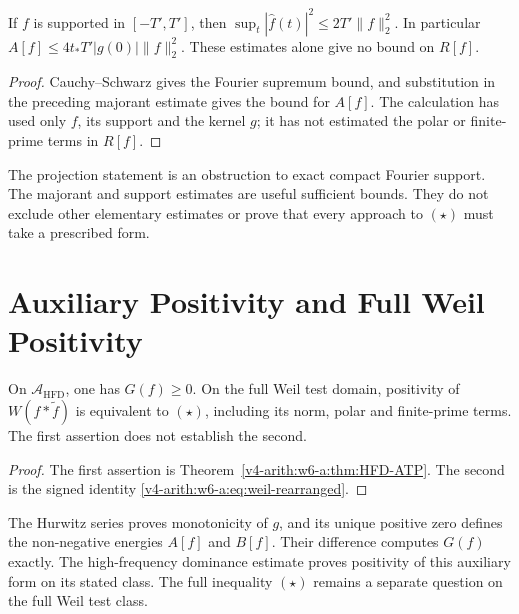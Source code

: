 \begin{proposition}
\label{v4-arith:w6-a:prop:rule-out-pw-shrinkage}
If \(f\) is supported in \([-T',T']\), then
\(\sup_t|\widehat f(t)|^2\leq2T'\|f\|_2^2\). In particular
\(A[f]\leq4t_*T'|g(0)|\|f\|_2^2\).
These estimates alone give no bound on \(R[f]\).
\end{proposition}
\begin{proof}
Cauchy--Schwarz gives the Fourier supremum bound, and substitution
in the preceding majorant estimate gives the bound for \(A[f]\).
The calculation has used only \(f\), its support and the kernel
\(g\); it has not estimated the polar or finite-prime terms in \(R[f]\).
\end{proof}

\begin{remark}
\label{v4-arith:w6-a:rem:three-rule-outs}
The projection statement is an obstruction to exact compact Fourier
support. The majorant and support estimates are useful sufficient
bounds. They do not exclude other elementary estimates or prove
that every approach to \((\star)\) must take a prescribed form.
\end{remark}

\section{Auxiliary Positivity and Full Weil Positivity}
\label{v4-arith:w6-a:irreducible}

\begin{theorem}
\label{v4-arith:w6-a:thm:irreducible-ATP}
On \(\mathscr A_{\mathrm{HFD}}\), one has
\(G(f)\geq0\). On the full Weil test domain, positivity of
\(W(f*\widetilde f)\) is equivalent to \((\star)\), including its
norm, polar and finite-prime terms. The first assertion does not
establish the second.
\end{theorem}
\begin{proof}
The first assertion is Theorem~\ref{v4-arith:w6-a:thm:HFD-ATP}.
The second is the signed identity
\eqref{v4-arith:w6-a:eq:weil-rearranged}.
\end{proof}

\begin{remark}
\label{v4-arith:w6-a:rem:honest-form}
The Hurwitz series proves monotonicity of \(g\), and its unique
positive zero defines the non-negative energies \(A[f]\) and
\(B[f]\). Their difference computes \(G(f)\) exactly. The
high-frequency dominance estimate proves positivity of this
auxiliary form on its stated class. The full inequality
\((\star)\) remains a separate question on the full Weil test class.
\end{remark}

